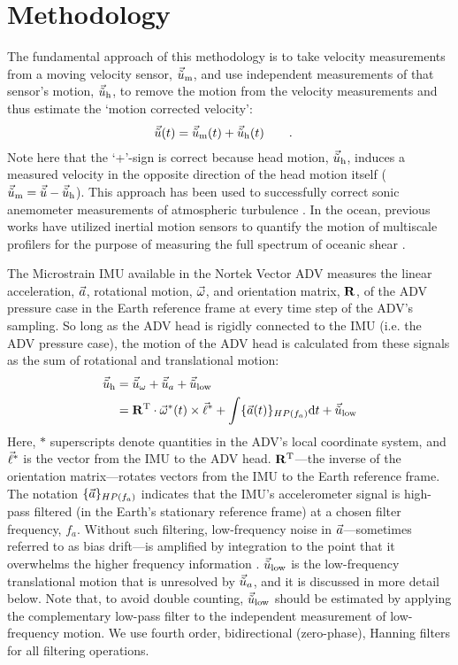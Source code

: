 
\section{Methodology}
\label{sec:methods}


\def\ue{\ensuremath{\vec{\tilde{u}}\earth}}


The fundamental approach of this methodology is to take velocity measurements from a moving velocity sensor, $\umeas$, and use independent measurements of that sensor's motion, $\uhead$, to remove the motion from the velocity measurements and thus estimate the `motion corrected velocity':
\begin{align}
  \label{eqn:u_mot_def}
  \ue(t) & = \umeas(t) + \uhead(t) \qquad .
\end{align}
Note here that the `+'-sign is correct because head motion, $\uhead$, induces a measured velocity in the opposite direction of the head motion itself ($\umeas = \ue - \uhead$). This approach has been used to successfully correct sonic anemometer measurements of atmospheric turbulence \cite[e.g., ][]{Edson++1998, Miller++2008}.  In the ocean, previous works have utilized inertial motion sensors to quantify the motion of multiscale profilers for the purpose of measuring the full spectrum of oceanic shear \cite[]{Winkel++1996}.

The Microstrain IMU available in the Nortek Vector ADV measures the linear acceleration, ${\vec{a}}$, rotational motion, $\vec{\omega}$, and orientation matrix, $\mathbf{R}$, of the ADV pressure case in the Earth reference frame at every time step of the ADV's sampling. So long as the ADV head is rigidly connected to the IMU (i.e. the ADV pressure case), the motion of the ADV head is calculated from these signals as the sum of rotational and translational motion:
\begin{align}
  \label{eqn:uhead}
\begin{split}
  \uhead & = \urot + \uacc + \ulow \\
      & = \omatinv \cdot \AngRt^*(t)\times\l + \int \{\Accel(t)\}_{HP(f_{a})} \mathrm{d}t + \ulow
\end{split}
\end{align}
Here, $*$ superscripts denote quantities in the ADV's local coordinate system, and $\vec{\ell}^*$ is the vector from the IMU to the ADV head. $\mathbf{R}^\mathrm{T}$---the inverse of the orientation matrix---rotates vectors from the IMU to the Earth reference frame. The notation $\{{\vec{a}}\}_{HP(f_a)}$ indicates that the IMU's accelerometer signal is high-pass filtered (in the Earth's stationary reference frame) at a chosen filter frequency, $f_a$. Without such filtering, low-frequency noise in ${\vec{a}}$---sometimes referred to as bias drift---is amplified by integration to the point that it overwhelms the higher frequency information \cite[]{Barshan+Whyte1995, Bevly2004, Gulmammadov2009}. $\ulow$ is the low-frequency translational motion that is unresolved by $\uacc$, and it is discussed in more detail below. Note that, to avoid double counting, $\ulow$ should be estimated by applying the complementary low-pass filter to the independent measurement of low-frequency motion. We use fourth order, bidirectional (zero-phase), Hanning filters for all filtering operations. 

